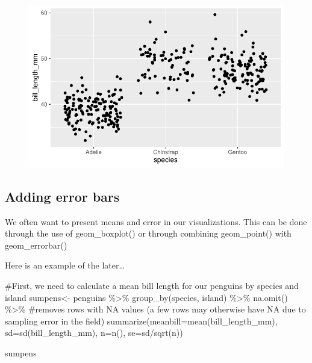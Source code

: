 \documentclass[
  letterpaper,
  DIV=11,
  numbers=noendperiod]{scrartcl}
\newenvironment{Shaded}{\begin{snugshade}}{\end{snugshade}}
\newcommand{\AttributeTok}[1]{\textcolor[rgb]{0.40,0.45,0.13}{#1}}
\newcommand{\CommentTok}[1]{\textcolor[rgb]{0.37,0.37,0.37}{#1}}
\newcommand{\FunctionTok}[1]{\textcolor[rgb]{0.28,0.35,0.67}{#1}}
\newcommand{\NormalTok}[1]{\textcolor[rgb]{0.00,0.23,0.31}{#1}}
\newcommand{\OtherTok}[1]{\textcolor[rgb]{0.00,0.23,0.31}{#1}}
\newcommand{\SpecialCharTok}[1]{\textcolor[rgb]{0.37,0.37,0.37}{#1}}
\begin{document}
\begin{figure}[H]

{\centering \includegraphics{Lab_2_files/figure-pdf/unnamed-chunk-17-1.pdf}

}

\end{figure}

\subsection{\texorpdfstring{\textbf{Adding error
bars}}{Adding error bars}}

We often want to present means and error in our visualizations. This can
be done through the use of geom\_boxplot() or through combining
geom\_point() with geom\_errorbar()

Here is an example of the later\ldots{}

\begin{Shaded}
\begin{Highlighting}[]
\CommentTok{\#First, we need to calculate a mean bill length for our penguins by species and island}
\NormalTok{sumpens}\OtherTok{\textless{}{-}}\NormalTok{ penguins }\SpecialCharTok{\%\textgreater{}\%}
  \FunctionTok{group\_by}\NormalTok{(species, island) }\SpecialCharTok{\%\textgreater{}\%}
  \FunctionTok{na.omit}\NormalTok{() }\SpecialCharTok{\%\textgreater{}\%} \CommentTok{\#removes rows with NA values (a few rows may otherwise have NA due to sampling error in the field)}
  \FunctionTok{summarize}\NormalTok{(}\AttributeTok{meanbill=}\FunctionTok{mean}\NormalTok{(bill\_length\_mm), }\AttributeTok{sd=}\FunctionTok{sd}\NormalTok{(bill\_length\_mm), }\AttributeTok{n=}\FunctionTok{n}\NormalTok{(), }\AttributeTok{se=}\NormalTok{sd}\SpecialCharTok{/}\FunctionTok{sqrt}\NormalTok{(n))}

\NormalTok{sumpens}
\end{Highlighting}
\end{Shaded}
\end{document}
